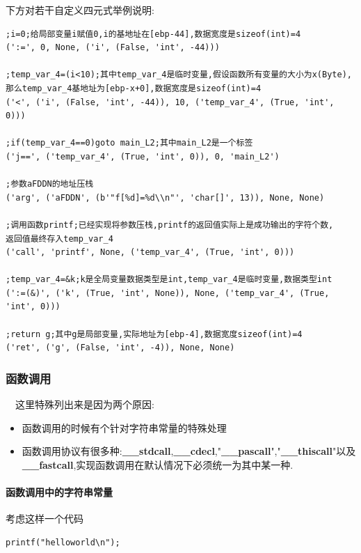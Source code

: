 \documentclass{article}
\begin{document}
下方对若干自定义四元式举例说明:

\begin{verbatim}
;i=0;给局部变量i赋值0,i的基地址在[ebp-44],数据宽度是sizeof(int)=4
(':=', 0, None, ('i', (False, 'int', -44)))

;temp_var_4=(i<10);其中temp_var_4是临时变量,假设函数所有变量的大小为x(Byte),
那么temp_var_4基地址为[ebp-x+0],数据宽度是sizeof(int)=4
('<', ('i', (False, 'int', -44)), 10, ('temp_var_4', (True, 'int', 0)))

;if(temp_var_4==0)goto main_L2;其中main_L2是一个标签
('j==', ('temp_var_4', (True, 'int', 0)), 0, 'main_L2')

;参数aFDDN的地址压栈
('arg', ('aFDDN', (b'"f[%d]=%d\\n"', 'char[]', 13)), None, None)

;调用函数printf;已经实现将参数压栈,printf的返回值实际上是成功输出的字符个数,
返回值最终存入temp_var_4
('call', 'printf', None, ('temp_var_4', (True, 'int', 0)))

;temp_var_4=&k;k是全局变量数据类型是int,temp_var_4是临时变量,数据类型int
(':=(&)', ('k', (True, 'int', None)), None, ('temp_var_4', (True, 'int', 0)))

;return g;其中g是局部变量,实际地址为[ebp-4],数据宽度sizeof(int)=4
('ret', ('g', (False, 'int', -4)), None, None)
\end{verbatim}

\subsubsection{函数调用}

\quad\ \ 这里特殊列出来是因为两个原因:

\begin{itemize}
\item 函数调用的时候有个针对字符串常量的特殊处理
\item 函数调用协议有很多种:\textbf{\_\_stdcall},\textbf{\_\_cdecl},"\textbf{\_\_pascall}","\textbf{\_\_thiscall}"以及\textbf{\_\_fastcall},实现函数调用在默认情况下必须统一为其中某一种.
\end{itemize}

\paragraph{函数调用中的字符串常量\\}
考虑这样一个代码

\begin{verbatim}
printf("helloworld\n");
\end{verbatim}
\end{document}
